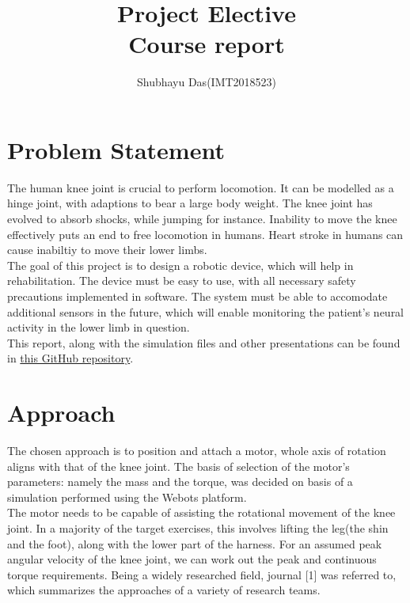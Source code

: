 \documentclass[a4paper]{article}
\title{Project Elective\\{\Large{Course report} }}
\author{Shubhayu Das(IMT2018523)}
\begin{document}
	\maketitle
	\tableofcontents

	\pagebreak

	\section{Problem Statement}
		The human knee joint is crucial to perform locomotion. It can be modelled as a hinge joint, with adaptions to bear a large body weight. The knee joint has evolved to absorb shocks, while jumping for instance. Inability to move the knee effectively puts an end to free locomotion in humans. Heart stroke in humans can cause inabiltiy to move their lower limbs.\\

		The goal of this project is to design a robotic device, which will help in rehabilitation. The device must be easy to use, with all necessary safety precautions implemented in software. The system must be able to accomodate additional sensors in the future, which will enable monitoring the patient's neural activity in the lower limb in question.\\

		This report, along with the simulation files and other presentations can be found in \href{https://github.com/Shubhayu-Das/PE_6th_sem}{this GitHub repository}.

	\section{Approach}
		The chosen approach is to position and attach a motor, whole axis of rotation aligns with that of the knee joint. The basis of selection of the motor's parameters: namely the mass and the torque, was decided on basis of a simulation performed using the Webots platform.\\

		The motor needs to be capable of assisting the rotational movement of the knee joint. In a majority of the target exercises, this involves lifting the leg(the shin and the foot), along with the lower part of the harness. For an assumed peak angular velocity of the knee joint, we can work out the peak and continuous torque requirements. Being a widely researched field, journal [1] was referred to, which summarizes the approaches of a variety of research teams.\\
\end{document}
